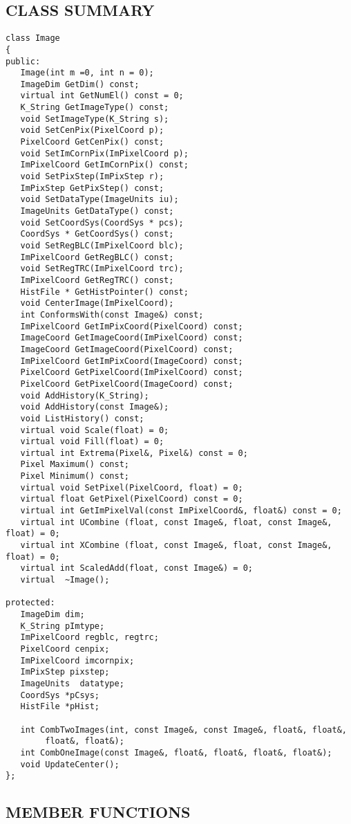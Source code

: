 \subsection*{CLASS SUMMARY}
\begin{verbatim}
class Image
{
public:
   Image(int m =0, int n = 0);
   ImageDim GetDim() const;
   virtual int GetNumEl() const = 0;
   K_String GetImageType() const;
   void SetImageType(K_String s);
   void SetCenPix(PixelCoord p);
   PixelCoord GetCenPix() const;
   void SetImCornPix(ImPixelCoord p);
   ImPixelCoord GetImCornPix() const;
   void SetPixStep(ImPixStep r);
   ImPixStep GetPixStep() const;
   void SetDataType(ImageUnits iu);
   ImageUnits GetDataType() const;
   void SetCoordSys(CoordSys * pcs);
   CoordSys * GetCoordSys() const;
   void SetRegBLC(ImPixelCoord blc);
   ImPixelCoord GetRegBLC() const;
   void SetRegTRC(ImPixelCoord trc);
   ImPixelCoord GetRegTRC() const;
   HistFile * GetHistPointer() const;
   void CenterImage(ImPixelCoord);
   int ConformsWith(const Image&) const;
   ImPixelCoord GetImPixCoord(PixelCoord) const;
   ImageCoord GetImageCoord(ImPixelCoord) const;
   ImageCoord GetImageCoord(PixelCoord) const;
   ImPixelCoord GetImPixCoord(ImageCoord) const;
   PixelCoord GetPixelCoord(ImPixelCoord) const;
   PixelCoord GetPixelCoord(ImageCoord) const;
   void AddHistory(K_String);
   void AddHistory(const Image&);
   void ListHistory() const;
   virtual void Scale(float) = 0;
   virtual void Fill(float) = 0;
   virtual int Extrema(Pixel&, Pixel&) const = 0;
   Pixel Maximum() const;
   Pixel Minimum() const;
   virtual void SetPixel(PixelCoord, float) = 0;
   virtual float GetPixel(PixelCoord) const = 0;
   virtual int GetImPixelVal(const ImPixelCoord&, float&) const = 0;
   virtual int UCombine (float, const Image&, float, const Image&, float) = 0;
   virtual int XCombine (float, const Image&, float, const Image&, float) = 0;
   virtual int ScaledAdd(float, const Image&) = 0;
   virtual  ~Image();

protected:
   ImageDim dim;
   K_String pImtype;
   ImPixelCoord regblc, regtrc;
   PixelCoord cenpix;
   ImPixelCoord imcornpix;
   ImPixStep pixstep;
   ImageUnits  datatype;
   CoordSys *pCsys;
   HistFile *pHist;

   int CombTwoImages(int, const Image&, const Image&, float&, float&,
		float&, float&);
   int CombOneImage(const Image&, float&, float&, float&, float&);
   void UpdateCenter();
};
\end{verbatim}

\subsection*{MEMBER FUNCTIONS}

